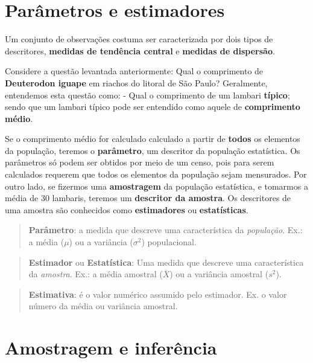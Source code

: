 \documentclass[
]{book}
\begin{document}
\hypertarget{paruxe2metros-e-estimadores}{%
\section{Parâmetros e estimadores}\label{paruxe2metros-e-estimadores}}

Um conjunto de observações costuma ser caracterizada por dois tipos de descritores, \textbf{medidas de tendência central} e \textbf{medidas de dispersão}.

Considere a questão levantada anteriormente: Qual o comprimento de \textbf{Deuterodon iguape} em riachos do litoral de São Paulo? Geralmente, entendemos esta questão como: - Qual o comprimento de um lambari \textbf{típico}; sendo que um lambari típico pode ser entendido como aquele de \textbf{comprimento médio}.

Se o comprimento médio for calculado calculado a partir de \textbf{todos} os elementos da população, teremos o \textbf{parâmetro}, um descritor da população estatística. Os parâmetros só podem ser obtidos por meio de um censo, pois para serem calculados requerem que todos os elementos da população sejam mensurados. Por outro lado, se fizermos uma \textbf{amostragem} da população estatística, e tomarmos a média de 30 lambaris, teremos um \textbf{descritor da amostra}. Os descritores de uma amostra são conhecidos como \textbf{estimadores} ou \textbf{estatísticas}.

\begin{quote}
\textbf{Parâmetro}: a medida que descreve uma característica da \textit{população}. Ex.: a média (\(\mu\)) ou a variância (\(\sigma^2\)) populacional.
\end{quote}

\begin{quote}
\textbf{Estimador} ou \textbf{Estatística}: Uma medida que descreve uma característica da \textit{amostra}. Ex.: a média amostral (\(\overline{X}\)) ou a variância amostral (\(s^2\)).
\end{quote}

\begin{quote}
\textbf{Estimativa}: é o valor numérico assumido pelo estimador. Ex. o valor número da média ou variância amostral.
\end{quote}

\hypertarget{amostragem-e-inferuxeancia}{%
\section{Amostragem e inferência}\label{amostragem-e-inferuxeancia}}
\end{document}
